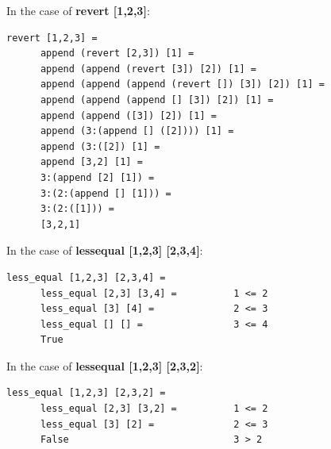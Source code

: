 \documentclass{article}
\theoremstyle{theorem}
\theoremstyle{definition}
\theoremstyle{remark}
\begin{document}
In the case of \textbf{revert [1,2,3]}:
\begin{lstlisting}
revert [1,2,3] =
      append (revert [2,3]) [1] =
      append (append (revert [3]) [2]) [1] =
      append (append (append (revert []) [3]) [2]) [1] =
      append (append (append [] [3]) [2]) [1] =
      append (append ([3]) [2]) [1] =
      append (3:(append [] ([2]))) [1] =
      append (3:([2]) [1] =
      append [3,2] [1] =
      3:(append [2] [1]) =
      3:(2:(append [] [1])) =
      3:(2:([1])) =
      [3,2,1]
\end{lstlisting}
In the case of \textbf{less\textunderscore equal [1,2,3] [2,3,4]}:
\begin{lstlisting}
less_equal [1,2,3] [2,3,4] = 
      less_equal [2,3] [3,4] =          1 <= 2
      less_equal [3] [4] =              2 <= 3
      less_equal [] [] =                3 <= 4
      True
\end{lstlisting}
In the case of \textbf{less\textunderscore equal [1,2,3] [2,3,2]}:
\begin{lstlisting}
less_equal [1,2,3] [2,3,2] = 
      less_equal [2,3] [3,2] =          1 <= 2
      less_equal [3] [2] =              2 <= 3
      False                             3 > 2
\end{lstlisting}
\end{document}
